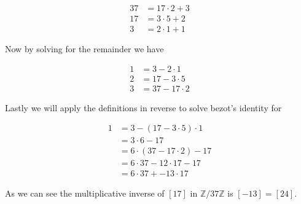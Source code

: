 \documentclass{article}
\begin{document}
      \[
        \begin{split}
          37 &= 17 \cdot 2 + 3\\
          17 &= 3 \cdot 5 + 2\\
          3 &= 2 \cdot 1 + 1
        \end{split}
      \]
      
      \noindent Now by solving for the remainder we have 

      \[
        \begin{split}
          1 &=  3  - 2 \cdot 1\\
          2 &=  17 - 3 \cdot 5\\
          3 &= 37 - 17 \cdot 2 
        \end{split}
      \]

      \noindent Lastly we will apply the definitions in reverse to solve bezot's identity for

      \[
        \begin{split}
          1 &=  3  - (17 - 3 \cdot 5) \cdot 1\\
          &= 3 \cdot 6 - 17\\
          &= 6 \cdot (37 - 17 \cdot 2) - 17 \\
          &= 6 \cdot 37 - 12 \cdot 17 - 17\\
          &= 6 \cdot 37 + -13 \cdot 17
        \end{split}
      \]

      \noindent As we can see the multiplicative inverse of $[17]$ in $\mathbb{Z}/37\mathbb{Z}$ is $[-13] = [24]$.
\end{document}
